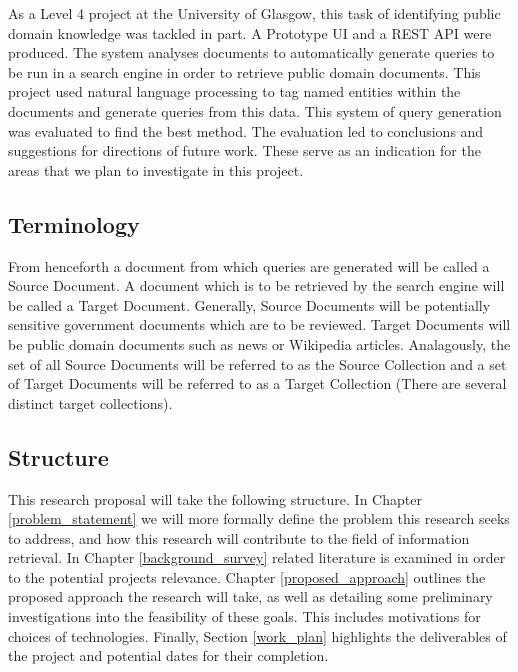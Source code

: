 \documentclass{mprop}
\begin{document}
As a Level 4 project at the University of Glasgow, this task of identifying public domain knowledge was tackled in part. A Prototype UI and a REST API were produced. The system analyses documents to automatically generate queries to be run in a search engine in order to retrieve public domain documents. This project used natural language processing to tag named entities within the documents and generate queries from this data. This system of query generation was evaluated to find the best method. The evaluation led to conclusions and suggestions for directions of future work. These serve as an indication for the areas that we plan to investigate in this project.

\subsection{Terminology}
From henceforth a document from which queries are generated will be called a Source Document. A document which is to be retrieved by the search engine will be called a Target Document.
Generally, Source Documents will be potentially sensitive government documents which are to be reviewed. Target Documents will be public domain documents such as news or Wikipedia articles.
Analagously, the set of all Source Documents will be referred to as the Source Collection and a set of Target Documents will be referred to as a Target Collection (There are several distinct target collections).

\subsection{Structure}
This research proposal will take the following structure. In Chapter \ref{problem_statement} we will more formally define the problem this research seeks to address, and how this research will contribute to the field of information retrieval. In Chapter \ref{background_survey} related literature is examined in order to  the potential projects relevance. Chapter \ref{proposed_approach} outlines the proposed approach the research will take, as well as detailing some preliminary investigations into the feasibility of these goals. This includes motivations for choices of technologies. Finally, Section \ref{work_plan} highlights the deliverables of the project and potential dates for their completion.

\end{document}
